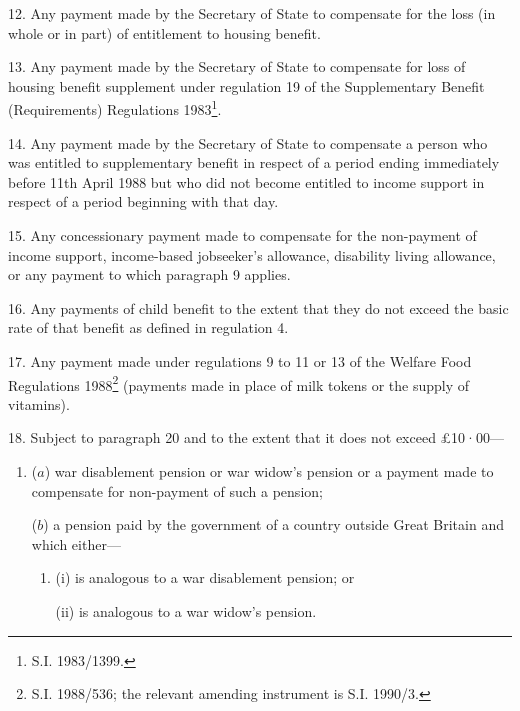 \documentclass[12pt,a4paper]{article}
\begin{document}
12.  Any payment made by the Secretary of State to compensate for the loss (in whole or in part) of entitlement to housing benefit.

\medskip

13.  Any payment made by the Secretary of State to compensate for loss of housing benefit supplement under regulation 19 of the Supplementary Benefit (Requirements) Regulations 1983\footnote{\frenchspacing S.I. 1983/1399.}.

\medskip

14.  Any payment made by the Secretary of State to compensate a person who was entitled to supplementary benefit in respect of a period ending immediately before 11th April 1988 but who did not become entitled to income support in respect of a period beginning with that day.

\medskip

15.  Any concessionary payment made to compensate for the non-payment of income support, 
income-based jobseeker’s allowance,  %
disability living allowance, or any payment to which paragraph 9 applies.


\medskip

16.  Any payments of child benefit to the extent that they do not exceed the basic rate of that benefit as defined in regulation 4.

\medskip

17.  Any payment made under regulations 9 to 11 or 13 of the Welfare Food Regulations 1988\footnote{\frenchspacing S.I. 1988/536; the relevant amending instrument is S.I. 1990/3.} (payments made in place of milk tokens or the supply of vitamins).

\medskip

18.  Subject to paragraph 20 and to the extent that it does not exceed £10·00—
\begin{enumerate}\item[]
($a$) war disablement pension or war widow’s pension or a payment made to compensate for non-payment of such a pension;

($b$) a pension paid by the government of a country outside Great Britain and which either—
\begin{enumerate}\item[]
(i) is analogous to a war disablement pension; or

(ii) is analogous to a war widow’s pension.
\end{enumerate}
\end{enumerate}
\end{document}
